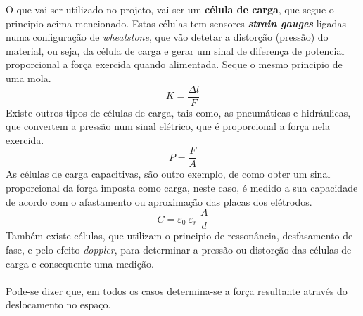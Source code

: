 O que vai ser utilizado no projeto, vai ser um \textbf{célula de carga}, que segue o principio acima mencionado. Estas células tem sensores \textit{\textbf{strain gauges}} ligadas numa configuração de \textit{wheatstone}, que vão detetar a distorção (pressão) do material, ou seja, da célula de carga e gerar um sinal de diferença de potencial proporcional a força exercida quando alimentada. Seque o mesmo principio de uma mola.
\begin{equation}
	\label{eq:Hooke}
	K = \frac{\Delta l}{F}
\end{equation}
Existe outros tipos de células de carga, tais como, as pneumáticas e hidráulicas, que convertem a pressão num sinal elétrico, que é proporcional a força nela exercida.
\begin{equation}
	\label{eq:Preasure}
	P = \frac{F}{A}
\end{equation}
As células de carga capacitivas, são outro exemplo, de como obter um sinal proporcional da força imposta como carga, neste caso, é medido a sua capacidade de acordo com o afastamento ou aproximação das placas dos elétrodos.
\begin{equation}
	\label{eq:Capacity}
	C = \varepsilon_{0} \; \varepsilon_{r} \; \frac{A}{d}
\end{equation}
Também existe células, que utilizam o principio de ressonância, desfasamento de fase, e pelo efeito \textit{doppler}, para determinar a pressão ou distorção das células de carga e consequente uma medição.
\\
\\
Pode-se dizer que, em todos os casos determina-se a força resultante através do deslocamento no espaço.
